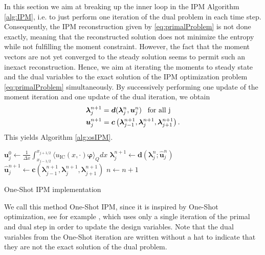 In this section we aim at breaking up the inner loop in the IPM Algorithm \ref{alg:IPM}, i.e. to just perform one iteration of the dual problem in each time step. Consequently, the IPM reconstruction given by \eqref{eq:primalProblem} is not done exactly, meaning that the reconstructed solution does not minimize the entropy while not fulfilling the moment constraint. However, the fact that the moment vectors are not yet converged to the steady solution seems to permit such an inexact reconstruction. Hence, we aim at iterating the moments to steady state and the dual variables to the exact solution of the IPM optimization problem \eqref{eq:primalProblem} simultaneously.
By successively performing one update of the moment iteration and one update of the dual iteration, we obtain 
\begin{subequations}\label{eq:oneshotIPM}
\begin{align}
&\bm{\lambda}_{j}^{n+1} =  \bm{d}(\bm{\lambda}_j^{n},\bm{u}_j^{n}) \enskip \text{ for all j} \label{eq:oneshotIPMdual}\\
&\bm{u}_j^{n+1} =  \bm{c}\left(\bm{\lambda}_{j-1}^{n+1},\bm{\lambda}_{j}^{n+1},\bm{\lambda}_{j+1}^{n+1}\right)\label{eq:oneshotIPMmoment}.
\end{align}
\end{subequations}
This yields Algorithm \ref{alg:osIPM}.
\begin{algorithm}[H]
\begin{algorithmic}[1]
\State $\bm{u}_j^0 \leftarrow \frac{1}{\Delta x} \int_{x_{j-1/ 2}}^{x_{j+1/ 2}} \langle u_{\text{IC}}(x, \cdot) \bm{\varphi} \rangle_Q dx$
\EndFor
{}
\State $\bm{\lambda}_j^{n+1} \leftarrow \bm{d}(\bm{\lambda}_{j}^{n};\bm{\hat u}_j^{n})$
\State $\bm{\hat u}_j^{n+1} \leftarrow \bm{c}(\bm{\lambda}_{j-1}^{n+1},\bm{\lambda}_j^{n+1},\bm{\lambda}_{j+1}^{n+1})$
\EndFor
\State $n \leftarrow n+1$
\EndWhile
\end{algorithmic}
\caption{One-Shot IPM implementation}
\label{alg:osIPM}
\end{algorithm}
We call this method One-Shot IPM, since it is inspired by One-Shot optimization, see for example \cite{hazra2005aerodynamic}, which uses only a single iteration of the primal and dual step in order to update the design variables. Note that the dual variables from the One-Shot iteration are written without a hat to indicate that they are not the exact solution of the dual problem.

